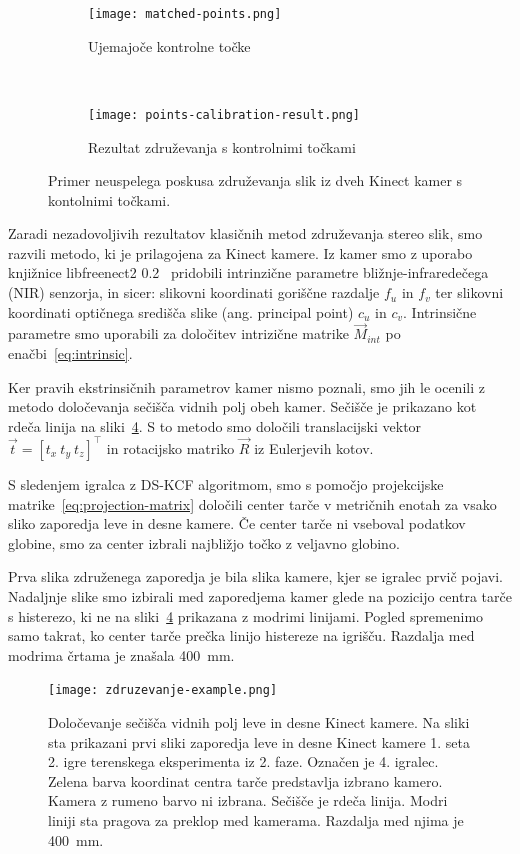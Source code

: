 \begin{figure}[!htb]
	\centering
	\begin{subfigure}[t]{0.45\columnwidth}
		\texttt{[image: matched-points.png]}
		\caption{Ujemajoče kontrolne točke}
		\label{fig:zdruzevanje-ujemajoce-cp}
	\end{subfigure}
	~
	\begin{subfigure}[t]{0.45\columnwidth}
		\texttt{[image: points-calibration-result.png]}
		\caption{Rezultat združevanja s kontrolnimi točkami}
		\label{fig:zdruzevanje-result-cp}
	\end{subfigure}
	\caption[Neuspelo združevanje slik s kontrolnimi točkami]{Primer neuspelega poskusa združevanja slik iz dveh Kinect kamer s kontolnimi točkami.}
	\label{fig:zdruzevanje-cp}
\end{figure}

Zaradi nezadovoljivih rezultatov klasičnih metod združevanja stereo slik, smo razvili metodo, ki je prilagojena za Kinect kamere. Iz kamer smo z uporabo knjižnice libfreenect2 0.2~\cite{lingzhu2016libfreenect2} pridobili intrinzične parametre bližnje-infraredečega (NIR) senzorja, in sicer: slikovni koordinati goriščne razdalje $f_u$ in $f_v$ ter slikovni koordinati optičnega središča slike (ang. principal point) $c_u$ in $c_v$. Intrinsične parametre smo uporabili za določitev intrizične matrike $\vec{M}_{int}$ po enačbi~\eqref{eq:intrinsic}.

Ker pravih ekstrinsičnih parametrov kamer nismo poznali, smo jih le ocenili z metodo določevanja sečišča vidnih polj obeh kamer. Sečišče je prikazano kot rdeča linija na sliki~\ref{fig:zdruzevanje}. S to metodo smo določili translacijski vektor $\vec{t} = \left [ t_x~ t_y~ t_z \right]^\top$ in rotacijsko matriko $\vec{R}$ iz Eulerjevih kotov.

S sledenjem igralca z DS-KCF algoritmom, smo s pomočjo projekcijske matrike~\eqref{eq:projection-matrix} določili center tarče v metričnih enotah za vsako sliko zaporedja leve in desne kamere. Če center tarče ni vseboval podatkov globine, smo za center izbrali najbližjo točko z veljavno globino.

Prva slika združenega zaporedja je bila slika kamere, kjer se igralec prvič pojavi. Nadaljnje slike smo izbirali med zaporedjema kamer glede na pozicijo centra tarče s histerezo, ki ne na sliki~\ref{fig:zdruzevanje} prikazana z modrimi linijami. Pogled spremenimo samo takrat, ko center tarče prečka linijo histereze na igrišču. Razdalja med modrima črtama je znašala \SI{400}{mm}.


\begin{figure}[!htb]
	\centering
	\texttt{[image: zdruzevanje-example.png]}
	\caption[Določevanje sečišča vidnih polj leve in desne Kinect kamere]{Določevanje sečišča vidnih polj leve in desne Kinect kamere. Na sliki sta prikazani prvi sliki zaporedja leve in desne Kinect kamere 1. seta 2. igre terenskega eksperimenta iz 2. faze. Označen je 4. igralec. Zelena barva koordinat centra tarče predstavlja izbrano kamero. Kamera z rumeno barvo ni izbrana. Sečišče je rdeča linija. Modri liniji sta pragova za preklop med kamerama. Razdalja med njima je \SI{400}{mm}.}
	\label{fig:zdruzevanje}
\end{figure}

